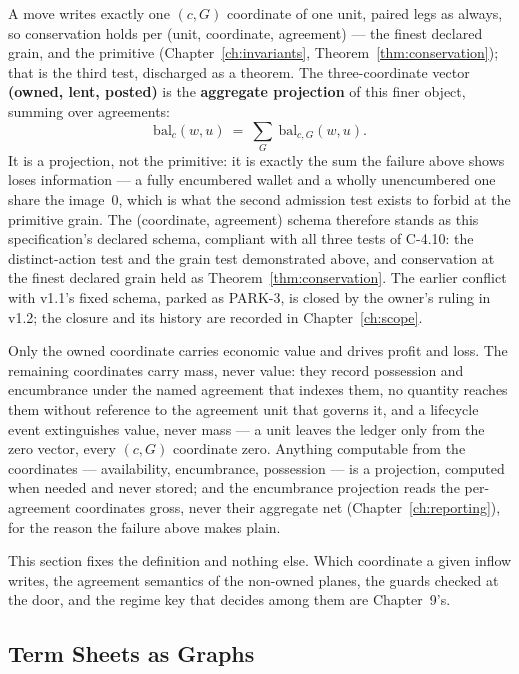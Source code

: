 \documentclass[11pt,a4paper]{article}
\begin{document}
A move writes exactly one $(c,G)$ coordinate of one unit, paired legs as always, so
conservation holds per (unit, coordinate, agreement) --- the finest declared grain, and
the primitive (Chapter~\ref{ch:invariants}, Theorem~\ref{thm:conservation}); that is the
third test, discharged as a theorem. The three-coordinate vector \textbf{(owned, lent,
posted)} is the \textbf{aggregate projection} of this finer object, summing over
agreements:
\[
\mathrm{bal}_c(w,u)\ =\ \sum_{G}\ \mathrm{bal}_{c,G}(w,u).
\]
It is a projection, not the primitive: it is exactly the sum the failure above shows loses
information --- a fully encumbered wallet and a wholly unencumbered one share the
image~$0$, which is what the second admission test exists to forbid at the primitive
grain. The (coordinate, agreement) schema therefore stands as this specification's
declared schema, compliant with all three tests of C-4.10: the distinct-action test and
the grain test demonstrated above, and conservation at the finest declared grain held as
Theorem~\ref{thm:conservation}. The earlier conflict with v1.1's fixed schema, parked as
PARK-3, is closed by the owner's ruling in v1.2; the closure and its history are recorded
in Chapter~\ref{ch:scope}.

Only the owned coordinate carries economic value and drives profit and loss. The remaining
coordinates carry mass, never value: they record possession and encumbrance under the
named agreement that indexes them, no quantity reaches them without reference to the
agreement unit that governs it, and a lifecycle event extinguishes value, never mass ---
a unit leaves the ledger only from the zero vector, every $(c,G)$ coordinate zero. Anything
computable from the coordinates --- availability, encumbrance, possession --- is a
projection, computed when needed and never stored; and the encumbrance projection reads
the per-agreement coordinates gross, never their aggregate net
(Chapter~\ref{ch:reporting}), for the reason the failure above makes plain.

This section fixes the definition and nothing else. Which coordinate a given inflow
writes, the agreement semantics of the non-owned planes, the guards checked at the door,
and the regime key that decides among them are Chapter~9's.

\subsection{Term Sheets as Graphs}\label{sec:termsheet-graphs}
\end{document}
